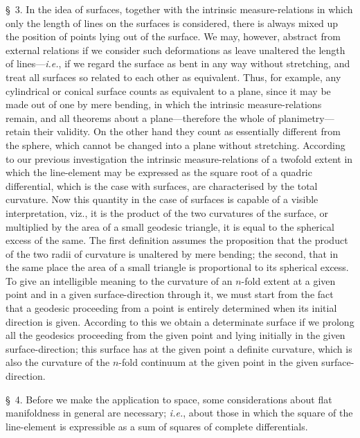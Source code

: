 \documentclass[a4paper,12pt]{article}
\begin{document}
\S~3.
In the idea of surfaces, together with the intrinsic
measure-relations in which only the length of lines on the
surfaces is considered, there is always mixed up the position of
points lying out of the surface.  We may, however, abstract from
external relations if we consider such deformations as leave
unaltered the length of lines---\emph{i.e.}, if we regard the
surface as bent in any way without stretching, and treat all
surfaces so related to each other as equivalent.  Thus, for
example, any cylindrical or conical surface counts as equivalent
to a plane, since it may be made out of one by mere bending, in
which the intrinsic measure-relations remain, and all theorems
about a plane---therefore the whole of planimetry---retain their
validity.  On the other hand they count as essentially different
from the sphere, which cannot be changed into a plane without
stretching.  According to our previous investigation the
intrinsic measure-relations of a twofold extent in which the
line-element may be expressed as the square root of a quadric
differential, which is the case with surfaces, are characterised
by the total curvature.  Now this quantity in the case of
surfaces is capable of a visible interpretation, viz., it is the
product of the two curvatures of the surface, or multiplied by
the area of a small geodesic triangle, it is equal to the
spherical excess of the same.  The first definition assumes the
proposition that the product of the two radii of curvature is
unaltered by mere bending; the second, that in the same place the
area of a small triangle is proportional to its spherical excess.
To give an intelligible meaning to the curvature of an $n$-fold
extent at a given point and in a given surface-direction through
it, we must start from the fact that a geodesic proceeding from a
point is entirely determined when its initial direction is given.
According to this we obtain a determinate surface if we prolong
all the geodesics proceeding from the given point and lying
initially in the given surface-direction; this surface has at the
given point a definite curvature, which is also the curvature of
the $n$-fold continuum at the given point in the given
surface-direction.

\bigbreak

\S~4.
Before we make the application to space, some
considerations about flat manifoldness in general are necessary;
\emph{i.e.}, about those in which the square of the line-element
is expressible as a sum of squares of complete differentials.
\end{document}
